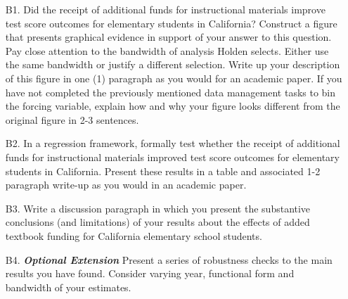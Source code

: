 \documentclass[a4paper, 11pt]{article}
\begin{document}
\begin{enumerate}
	\item[B1.] Did the receipt of additional funds for instructional materials improve test score outcomes for elementary students in California? Construct a figure that presents graphical evidence in support of your answer to this question. Pay close attention to the bandwidth of analysis Holden selects. Either use the same bandwidth or justify a different selection. Write up your description of this figure in one (1) paragraph as you would for an academic paper. If you have not completed the previously mentioned data management tasks to bin the forcing variable, explain how and why your figure looks different from the original figure in 2-3 sentences.
	\item[B2.] In a regression framework, formally test whether the receipt of additional funds for instructional materials improved test score outcomes for elementary students in California. Present these results in a table and associated 1-2 paragraph write-up as you would in an academic paper.
	\item[B3.] Write a discussion paragraph in which you present the substantive conclusions (and limitations) of your results about the effects of added textbook funding for California elementary school students.
	\item[B4.] \textbf{\textit{Optional Extension}} Present a series of robustness checks to the main results you have found. Consider varying year, functional form and bandwidth of your estimates.
\end{enumerate}
\end{document}
